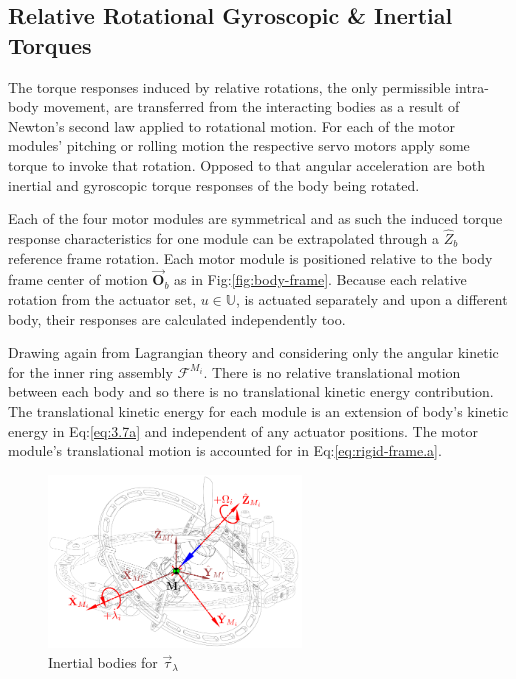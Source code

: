 \subsection{Relative Rotational Gyroscopic \& Inertial Torques}
\label{subsec:dynamics.nonlinearities.gyrotorques}
The torque responses induced by relative rotations, the only permissible intra-body movement, are transferred from the interacting bodies as a result of Newton's second law applied to rotational motion. For each of the motor modules' pitching or rolling motion the respective servo motors apply some torque to invoke that rotation. Opposed to that angular acceleration are both inertial and gyroscopic torque responses of the body being rotated.
\par
Each of the four motor modules are symmetrical and as such the induced torque response characteristics for one module can be extrapolated through a $\hat{Z}_b$ reference frame rotation. Each motor module is positioned relative to the body frame center of motion $\vec{\mathbf{O}}_b$ as in Fig:\ref{fig:body-frame}. Because each relative rotation from the actuator set, $u\in\mathbb{U}$, is actuated separately and upon a different body, their responses are calculated independently too.
\par
Drawing again from Lagrangian theory and considering only the angular kinetic for the inner ring assembly $\mathcal{F}^{M_i}$. There is no relative translational motion between each body and so there is no translational kinetic energy contribution. The translational kinetic energy for each module is an extension of body's kinetic energy in Eq:\ref{eq:3.7a} and independent of any actuator positions. The motor module's translational motion is accounted for in Eq:\ref{eq:rigid-frame.a}. 
\newpage
\begin{figure}
\centering
\includegraphics[width=0.6\textwidth]{figs/response-inner}
\caption{Inertial bodies for $\vec{\tau}_\lambda$}
\label{fig:response-inner}
\end{figure}
